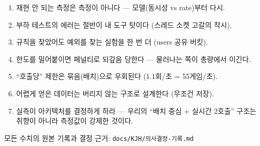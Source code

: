 \documentclass[11pt]{article}
\begin{document}
\begin{enumerate}
  \item 재현 안 되는 측정은 측정이 아니다 --- 모델(동시성 vs rate)부터 다시.
  \item 부하 테스트의 에러는 절반이 내 도구 탓이다 (스레드 소켓 고갈의 착시).
  \item 규칙을 찾았어도 예외를 찾는 실험을 한 번 더 (users 공유 버킷).
  \item 한도를 밀어붙이면 페널티로 되갚음 당한다 --- 물러나는 쪽이 총량에서 이긴다.
  \item ``호출당'' 제한은 묶음(배치)으로 우회된다 (1.1회/초 = 55게임/초).
  \item 어렵게 얻은 데이터는 버리지 않는 구조로 설계한다 (무조건 저장).
  \item 실측이 아키텍처를 결정하게 하라 --- 우리의 ``배치 중심 + 실시간 2호출'' 구조는
        취향이 아니라 측정값이 강제한 것이다.
\end{enumerate}

\bigskip
\noindent 모든 수치의 원본 기록과 결정 근거: \texttt{docs/KJH/의사결정-기록.md}
\end{document}
